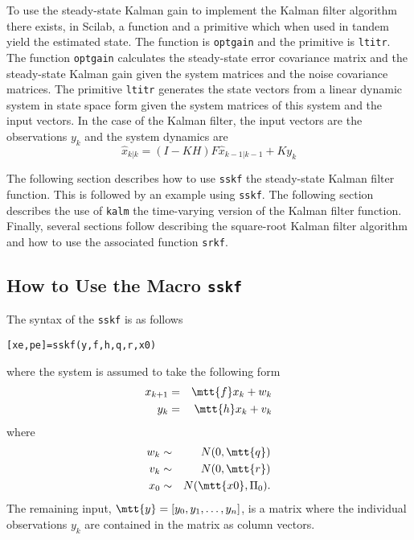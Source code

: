 	To use the steady-state
Kalman gain to implement the Kalman filter algorithm there exists,
in Scilab, a function and a primitive which when 
used in tandem yield the estimated state.
The function is {\tt optgain} and the primitive is {\tt ltitr}.  The function
{\tt optgain} calculates the steady-state error covariance matrix
and the steady-state Kalman gain given the system matrices and the
noise covariance matrices.  The primitive {\tt ltitr} generates
the state vectors from a linear dynamic system in state space form
given the system matrices of this system and the input vectors.
In the case of the Kalman filter, the input vectors are the observations
$y_k$ and the system dynamics are
%
\begin{equation}
\hat{x}_{k|k}=(I-KH)F\hat{x}_{k-1|k-1}+Ky_k
\label{e.kf34a}
\end{equation}
%

	The following section describes how to use {\tt sskf} the steady-state 
Kalman filter function.  This is followed by an example using {\tt sskf}.
The following section describes the use of {\tt kalm} the time-varying
version of the Kalman filter function.  Finally, several sections follow
describing the square-root Kalman filter algorithm and how to use the
associated function {\tt srkf}.

\subsection{How to Use the Macro {\tt sskf}}

	The syntax of the {\tt sskf} is as follows
\begin{verbatim}
[xe,pe]=sskf(y,f,h,q,r,x0)
\end{verbatim}
where the system is assumed to take the following form
%
\begin{eqnarray}
x_{k+1}&=&\mtt{ f}x_k+w_k\nonumber\\
y_k&=&\mtt{ h}x_k+v_k\nonumber
\end{eqnarray}
%
where
%
\begin{eqnarray}
w_k&\sim& N(0,\mtt{ q})\nonumber\\
v_k&\sim& N(0,\mtt{ r})\nonumber\\
x_0&\sim& N(\mtt{ x0},\Pi_0).\nonumber
\end{eqnarray}
%
The remaining input, $\mtt{ y}=[y_0,y_1,\ldots,y_n]$, is a matrix where
the individual observations $y_k$ are contained in the matrix as
column vectors.

